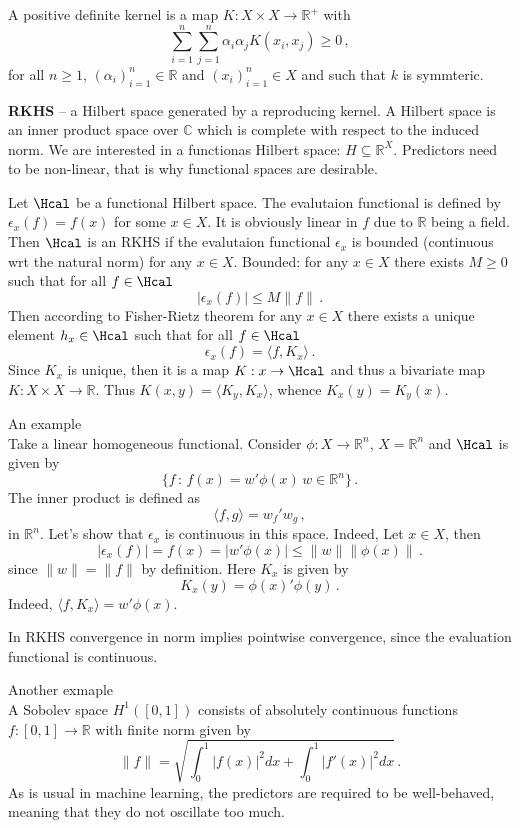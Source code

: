 \documentclass[a4paper]{article}
\newcommand{\Real}{\mathbb{R}}
\newcommand{\Cplx}{\mathbb{C}}
\begin{document}
A positive definite kernel is a map $K:X\times X \to \Real^+$ with 
\[ \sum_{i=1}^n \sum_{j=1}^n \alpha_i \alpha_j K(x_i,x_j) \geq 0 \,, \]
for all $n\geq 1$, $(\alpha_i)_{i=1}^n\in \Real$ and $(x_i)_{i=1}^n\in X$
and such that $k$ is symmteric.

\textbf{RKHS} -- a Hilbert space generated by a reproducing kernel.
A Hilbert space is an inner product space over $\Cplx$ which is complete with
respect to the induced norm. We are interested in a functionas Hilbert space:
$ H\subseteq \Real^X $. Predictors need to be non-linear, that is why functional
spaces are desirable.

Let $\Hcal$ be a functional Hilbert space. The evalutaion functional is defined
by $\epsilon_x(f) = f(x)$ for some $x\in X$. It is obviously linear in $f$ due
to $\Real$ being a field. Then $\Hcal$ is an RKHS if the evalutaion functional
$\epsilon_x$ is bounded (continuous wrt the natural norm) for any $x\in X$.
Bounded: for any $x\in X$ there exists $M\geq 0$ such that for all $f\in \Hcal$
\[ | \epsilon_x(f)| \leq M \|f\| \,. \]
Then according to Fisher-Rietz theorem for any $x\in X$ there exists a unique
element $h_x\in \Hcal$ such that for all $f\in \Hcal$
\[ \epsilon_x(f) = \langle f, K_x\rangle \,. \]
Since $K_x$ is unique, then it is a map $K:x\to \Hcal$ and thus a bivariate map
$K:X\times X\to\Real$. Thus $K(x,y) = \langle K_y, K_x \rangle$, whence
$K_x(y) = K_y(x)$.

\noindent An example\hfill \\
Take a linear homogeneous functional. Consider $\phi:X\to \Real^n$, $X=\Real^n$
and $\Hcal$ is given by
\[ \{ f\,:\, f(x) = w'\phi(x)\, w\in \Real^n \} \,.\]
The inner product is defined as
\[  \langle f, g\rangle = w_f'w_g \,, \]
in $\Real^n$. Let's show that $\epsilon_x$ is continuous in this space. Indeed,
Let $x\in X$, then
\[ |\epsilon_x(f)| = f(x) = |w'\phi(x)| \leq \|w\| \|\phi(x)\| \,. \]
since $\|w\| = \|f\|$ by definition. Here $K_x$ is given by 
\[ K_x(y) = \phi(x)' \phi(y) \,. \]
Indeed, $\langle f, K_x \rangle = w'\phi(x)$.

In RKHS convergence in norm implies pointwise convergence, since the evaluation
functional is continuous.

\noindent Another exmaple\hfill\\
A Sobolev space $H^1([0,1])$ consists of absolutely continuous functions $f:[0,1]\to \Real$
with finite norm given by
\[ \| f \| = \sqrt{ \int_0^1 |f(x)|^2 dx + \int_0^1 |f'(x)|^2 dx } \,.\]
As is usual in machine learning, the predictors are required to be well-behaved,
meaning that they do not oscillate too much.
\end{document}
